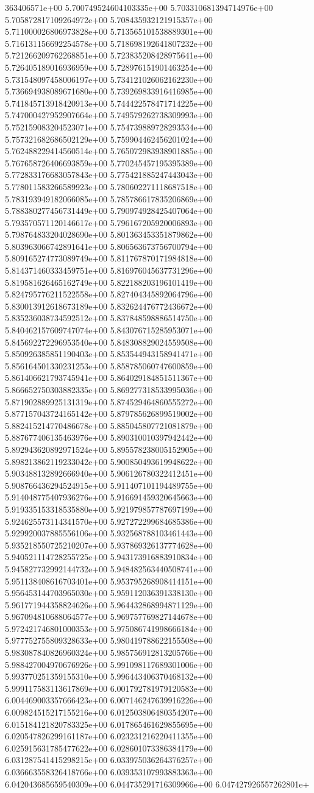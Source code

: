 363406571e+00	5.700749524604103335e+00	5.703310681394714976e+00	5.705872817109264972e+00	5.708435932121915357e+00	5.711000026806973828e+00	5.713565101538889301e+00	5.716131156692254578e+00	5.718698192641807232e+00	5.721266209762268851e+00	5.723835208428975641e+00	5.726405189016936959e+00	5.728976151901463254e+00	5.731548097458006197e+00	5.734121026062162230e+00	5.736694938089671680e+00	5.739269833916416985e+00	5.741845713918420913e+00	5.744422578471714225e+00	5.747000427952907664e+00	5.749579262738309993e+00	5.752159083204523071e+00	5.754739889728293534e+00	5.757321682686502129e+00	5.759904462456201024e+00	5.762488229414560514e+00	5.765072983938901885e+00	5.767658726406693859e+00	5.770245457195395389e+00	5.772833176683057843e+00	5.775421885247443043e+00	5.778011583266589923e+00	5.780602271118687518e+00	5.783193949182066085e+00	5.785786617835206869e+00	5.788380277456731449e+00	5.790974928425407064e+00	5.793570571120146617e+00	5.796167205920006893e+00	5.798764833204028690e+00	5.801363453351879862e+00	5.803963066742891641e+00	5.806563673756700794e+00	5.809165274773089749e+00	5.811767870171984818e+00	5.814371460333459751e+00	5.816976045637731296e+00	5.819581626465162749e+00	5.822188203196101419e+00	5.824795776211522558e+00	5.827404345892064796e+00	5.830013912618673189e+00	5.832624476772436672e+00	5.835236038734592512e+00	5.837848598886514750e+00	5.840462157609747074e+00	5.843076715285953071e+00	5.845692272296953540e+00	5.848308829024559508e+00	5.850926385851190403e+00	5.853544943158941471e+00	5.856164501330231253e+00	5.858785060747600859e+00	5.861406621793745941e+00	5.864029184851511367e+00	5.866652750303882335e+00	5.869277318533995036e+00	5.871902889925131319e+00	5.874529464860555272e+00	5.877157043724165142e+00	5.879785626899519002e+00	5.882415214770486678e+00	5.885045807721081879e+00	5.887677406135463976e+00	5.890310010397942442e+00	5.892943620892971524e+00	5.895578238005152905e+00	5.898213862119233042e+00	5.900850493619948622e+00	5.903488132892666940e+00	5.906126780322412451e+00	5.908766436294524915e+00	5.911407101194489755e+00	5.914048775407936276e+00	5.916691459320645663e+00	5.919335153318535880e+00	5.921979857787697199e+00	5.924625573114341570e+00	5.927272299684685386e+00	5.929920037885556106e+00	5.932568788103461443e+00	5.935218550725210207e+00	5.937869326137774628e+00	5.940521114728255725e+00	5.943173916883910834e+00	5.945827732992144732e+00	5.948482563440508741e+00	5.951138408616703401e+00	5.953795268908414151e+00	5.956453144703965030e+00	5.959112036391338130e+00	5.961771944358824626e+00	5.964432868994871129e+00	5.967094810688064577e+00	5.969757769827144678e+00	5.972421746801000353e+00	5.975086741998666184e+00	5.977752755809328633e+00	5.980419788622155508e+00	5.983087840826960324e+00	5.985756912813205766e+00	5.988427004970676926e+00	5.991098117689301006e+00	5.993770251359155310e+00	5.996443406370468132e+00	5.999117583113617869e+00	6.001792781979120583e+00	6.004469003357666423e+00	6.007146247639916226e+00	6.009824515217155216e+00	6.012503806480354207e+00	6.015184121820783325e+00	6.017865461629855695e+00	6.020547826299161187e+00	6.023231216220411355e+00	6.025915631785477622e+00	6.028601073386384179e+00	6.031287541415298215e+00	6.033975036264376257e+00	6.036663558326418766e+00	6.039353107993883363e+00	6.042043685659540309e+00	6.044735291716309966e+00	6.047427926557262801e+